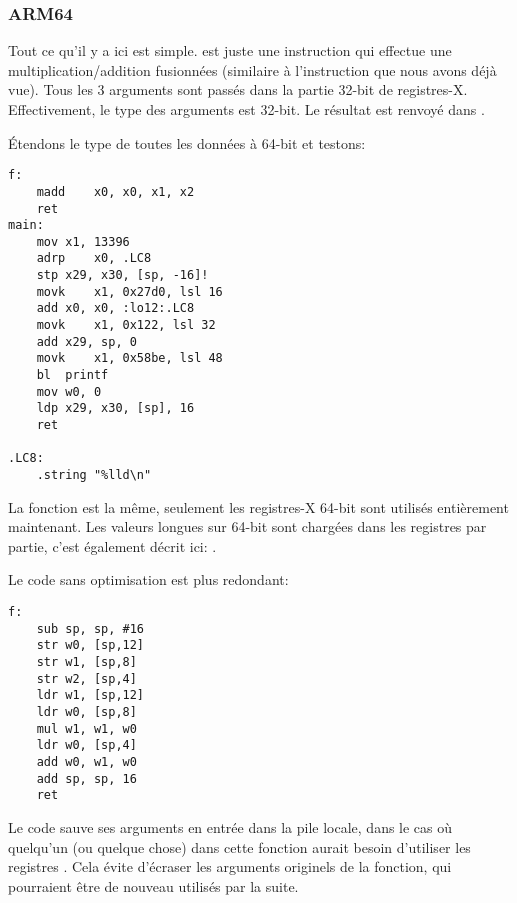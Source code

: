 \subsubsection{ARM64}


Tout ce qu'il y a ici est simple.
 est juste une instruction qui effectue une multiplication/addition fusionnées
(similaire à l'instruction  que nous avons déjà vue).
Tous les 3 arguments sont passés dans la partie 32-bit de registres-X.
Effectivement, le type des arguments est  32-bit.
Le résultat est renvoyé dans .



Étendons le type de toutes les données à 64-bit  et testons:



\begin{lstlisting}[style=customasmARM]
f:
	madd	x0, x0, x1, x2
	ret
main:
	mov	x1, 13396
	adrp	x0, .LC8
	stp	x29, x30, [sp, -16]!
	movk	x1, 0x27d0, lsl 16
	add	x0, x0, :lo12:.LC8
	movk	x1, 0x122, lsl 32
	add	x29, sp, 0
	movk	x1, 0x58be, lsl 48
	bl	printf
	mov	w0, 0
	ldp	x29, x30, [sp], 16
	ret

.LC8:
	.string	"%lld\n"
\end{lstlisting}

La fonction \ttf{} est la même, seulement les registres-X 64-bit sont utilisés entièrement
maintenant.
Les valeurs longues sur 64-bit sont chargées dans les registres par partie, c'est
également décrit ici: .


Le code sans optimisation est plus redondant:

\begin{lstlisting}[style=customasmARM]
f:
	sub	sp, sp, #16
	str	w0, [sp,12]
	str	w1, [sp,8]
	str	w2, [sp,4]
	ldr	w1, [sp,12]
	ldr	w0, [sp,8]
	mul	w1, w1, w0
	ldr	w0, [sp,4]
	add	w0, w1, w0
	add	sp, sp, 16
	ret
\end{lstlisting}

Le code sauve ses arguments en entrée dans la pile locale, dans le cas où quelqu'un
(ou quelque chose) dans cette fonction aurait besoin d'utiliser les registres .
Cela évite d'écraser les arguments originels de la fonction, qui pourraient être
de nouveau utilisés par la suite.

